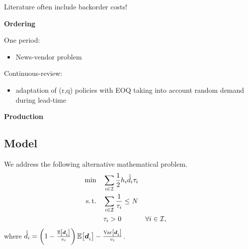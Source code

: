 Literature often include backorder costs!

\medskip

\textbf{Ordering}

One period:
\begin{itemize}
  \item News-vendor problem \cite{Edgeworth88,Arrow1951}
\end{itemize}

Continuous-review:
\begin{itemize}
  \item adaptation of (r,q) policies with EOQ taking into account random demand during lead-time \cite{Gallego1998}
\end{itemize}

\medskip

\textbf{Production}







\subsection{Model}


We address the following alternative mathematical problem.
\begin{subequations}\label{eq:lot-size:single-line:stochastic:unconstrained}
  \begin{align}
  \min\quad & \displaystyle\sum_{i\in\mathcal{I}} \frac{1}{2}h_i\tilde{\tilde{d}}_i\tau_i
  \label{eq:lot-size:single-line:stochastic:unconstrained:objective}
  \\
  \operatorname{s.t.}\quad  & \displaystyle\sum_{i\in\mathcal{I}} \frac{1}{\tau_i} \le N
  \label{eq:lot-size:single-line:stochastic:unconstrained:flexibility}
  \\
       & \tau_i > 0 && \forall i\in\mathcal{I},
  \label{eq:lot-size:single-line:stochastic:unconstrained:positivity}
  \end{align}
\end{subequations}
where $\tilde{\tilde{\demand}}_i=\bracket{1-\frac{\espe\sqbracket{\va\demand_i}}{\rate_i}}\espe\sqbracket{\va\demand_i} - \frac{\vari\sqbracket{\va\demand_i}}{\rate_i}$.

